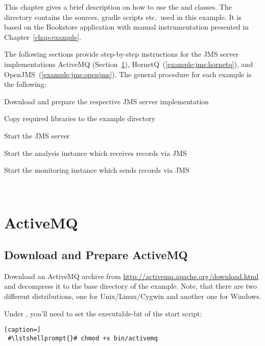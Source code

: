 This chapter gives a brief description on how to use the  and  %
classes. The directory \dir{\JMSBookstoreApplicationReleaseDirDistro/} contains the %
sources, gradle scripts etc.\ used in this example. It is based on the Bookstore %
application with manual instrumentation presented in Chapter~\ref{chap:example}. %

The following sections provide step-by-step instructions for the %
JMS server implementations ActiveMQ (Section~\ref{example:jms:activemq}), %
HornetQ~(\ref{example:jms:hornetq}), and OpenJMS~(\ref{example:jms:openjms}).
The general procedure for each example is the following:

\medskip

\begin{compactenum}
 \item Download and prepare the respective JMS server implementation
 \item Copy required libraries to the example directory
 \item Start the JMS server
 \item Start the analysis instance which receives records via JMS
 \item Start the monitoring instance which sends records via JMS
\end{compactenum}

\


\section{ActiveMQ}\label{example:jms:activemq}

\subsection{Download and Prepare ActiveMQ}

Download an ActiveMQ archive from \url{http://activemq.apache.org/download.html}
and decompress it to the base directory of the example. Note, that there are two different %
distributions, one for Unix/Linux/Cygwin and another one for Windows. 

Under \UnixLikeSystems{}, you'll need to set the executable-bit of the start script:

\setBashListing
\begin{lstlisting}[caption=]
 #\lstshellprompt{}# chmod +x bin/activemq
\end{lstlisting}

